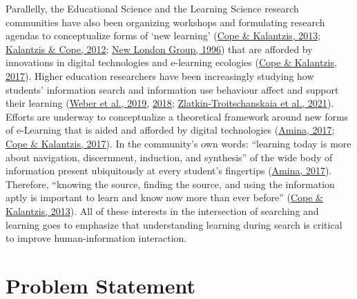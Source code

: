\documentclass[letterpaper, nobind]{templates/ociamthesis}
\begin{document}
Parallelly, the Educational Science and the Learning Science research communities have also been organizing workshops and formulating research
agendas to conceptualize forms of `new learning' (\protect\hyperlink{ref-cope2013new}{Cope \& Kalantzis, 2013}; \protect\hyperlink{ref-kalantzis2012newa}{Kalantzis \& Cope, 2012}; \protect\hyperlink{ref-newlondon1996pedagogy}{New London Group, 1996}) that are afforded by innovations in digital technologies and e-learning ecologies (\protect\hyperlink{ref-cope2017elearningc}{Cope \& Kalantzis, 2017}).
Higher education researchers have been increasingly studying how students' information search and information use behaviour affect and support their learning (\protect\hyperlink{ref-weber2019informationseeking}{Weber et al., 2019}, \protect\hyperlink{ref-weber2018can}{2018}; \protect\hyperlink{ref-zlatkin2021students}{Zlatkin-Troitschanskaia et al., 2021}).
Efforts are underway to conceptualize a theoretical framework around new forms of e-Learning that is aided and afforded by digital technologies (\protect\hyperlink{ref-amina2017active}{Amina, 2017}; \protect\hyperlink{ref-cope2017elearningc}{Cope \& Kalantzis, 2017}).
In the community's own words: ``learning today is more about navigation, discernment, induction, and synthesis'' of the wide body of information present ubiquitously at every student's fingertips (\protect\hyperlink{ref-amina2017active}{Amina, 2017}).
Therefore, ``knowing the source, finding the source, and using the information aptly is important to learn and know now more than ever before'' (\protect\hyperlink{ref-cope2013new}{Cope \& Kalantzis, 2013}).
All of these interests in the intersection of searching and learning goes to emphasize that understanding learning during search is critical to
improve human-information interaction.

\hypertarget{sec-intro-problem-statement}{%
\section{Problem Statement}\label{sec-intro-problem-statement}}
\end{document}
